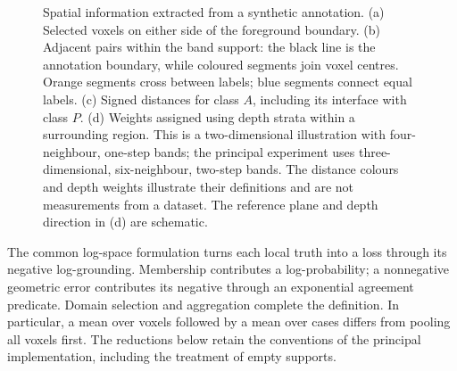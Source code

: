 \documentclass[12pt,a4paper]{article}
\begin{document}
\begin{figure}[htbp]
\caption{Spatial information extracted from a synthetic annotation.
(a) Selected voxels on either side of the foreground boundary.
(b) Adjacent pairs within the band support: the black line is the
annotation boundary, while coloured segments join voxel centres. Orange
segments cross between labels; blue segments connect equal labels. (c) Signed distances for class $A$, including its interface with
class $P$. (d) Weights assigned using depth strata within a surrounding
region. This is a two-dimensional illustration with four-neighbour,
one-step bands; the principal experiment uses three-dimensional,
six-neighbour, two-step bands. The distance colours and depth weights
illustrate their definitions and are not measurements from a dataset.
The reference plane and depth direction in (d) are schematic.}
\label{fig:constraint-domains}
\end{figure}

The common log-space formulation turns each local truth into a loss
through its negative log-grounding. Membership contributes a
log-probability; a nonnegative geometric error contributes its negative
through an exponential agreement predicate. Domain selection and
aggregation complete the definition. In particular, a mean over voxels
followed by a mean over cases differs from pooling all voxels first.
The reductions below retain the conventions of the principal
implementation, including the treatment of empty supports.
\end{document}
